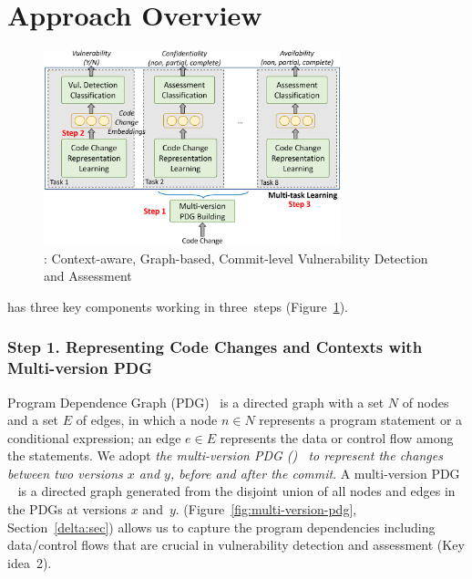 \section{Approach Overview}
\label{overview:sec}

\begin{figure}[t]
	\centering
	\includegraphics[width=3.4in]{graphs/overview-4.png}
	\vspace{-16pt}
	\caption{{\tool}: Context-aware, Graph-based, Commit-level
Vulnerability Detection and Assessment}
	\label{fig:overview}
\end{figure}


\noindent {\tool} has three key components working in three~steps
(Figure~\ref{fig:overview}).



\subsubsection*{{\bf Step 1. Representing Code Changes and Contexts with Multi-version PDG}}
Program Dependence Graph (PDG)~\cite{pdg} is a directed graph with a
set $N$ of nodes and a set $E$ of edges, in which a node $n \in N$
represents a program statement or a conditional expression; an edge $e
\in E$ represents the data or control flow among the statements.
We adopt {\em the multi-version PDG ({\mvpdgxy})~\cite{flexeme-fse20} to
represent the changes between two versions $x$ and $y$, before and
after the commit}.  A multi-version PDG {\mvpdgxy}~\cite{flexeme-fse20}
is a directed graph generated from the disjoint union of all nodes and
edges in the PDGs at versions $x$ and~$y$. {\mvpdgxy}
(Figure~\ref{fig:multi-version-pdg}, Section~\ref{delta:sec}) allows
us to capture the program dependencies including data/control flows
that are crucial in vulnerability detection and assessment (Key
idea~2).

